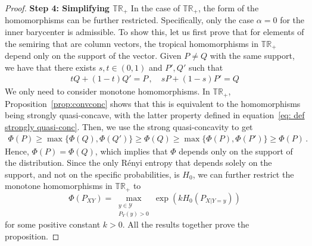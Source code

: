 \documentclass[aps,pra,11pt,onecolumn,nofootinbib,tightenlines]{revtex4-2}
\newtheorem{proposition}[theorem]{Proposition}
\theoremstyle{definition}
\begin{document}
\begin{proof}
\noindent \textbf{Step 4: Simplifying $\mathbb{TR}_+$} In the case of $\mathbb{TR}_+$, the form of the homomorphisms can be further restricted. Specifically, only the case $\alpha = 0$ for the inner barycenter is admissible. To show this, let us first prove that for elements of the semiring that are column vectors, the tropical homomorphisms in $\mathbb{TR}_+$ depend only on the support of the vector. Given $P\neq Q$ with the same support, we have that there exists $s,t \in (0,1)$ and $P',Q'$ such that
\begin{align}
   tQ+(1-t)Q'=P\,, \quad  sP+(1-s)P'=Q 
\end{align}
We only need to consider monotone homomorphisms. In \(\mathbb{TR}_+\), Proposition~\ref{prop:convconc} shows that this is equivalent to the homomorphisms being strongly quasi-concave, with the latter property defined in equation~\eqref{eq: def strongly quasi-conc}.
Then, we use the strong quasi-concavity to get
\begin{align}
    \Phi(P) \geq \max \{\Phi(Q),\Phi(Q')\} \geq \Phi(Q) \geq \max \{\Phi(P),\Phi(P')\} \geq \Phi(P) \,.
\end{align}
Hence, $\Phi(P) = \Phi(Q)$, which implies that $\Phi$ depends only on the support of the distribution. Since the only Rényi entropy that depends solely on the support, and not on the specific probabilities, is $H_0$, we can further restrict the monotone homomorphisms in $\mathbb{TR}_+$ to
\begin{equation}
    \Phi(P_{XY}) = \max \limits_{\substack{y \in \mathcal{Y} \\ P_Y( y) > 0}}
    \exp(kH_0(P_{X|Y=y}))
\end{equation}
for some positive constant $k>0$.
All the results together prove the proposition.
\end{proof}


\end{document}
